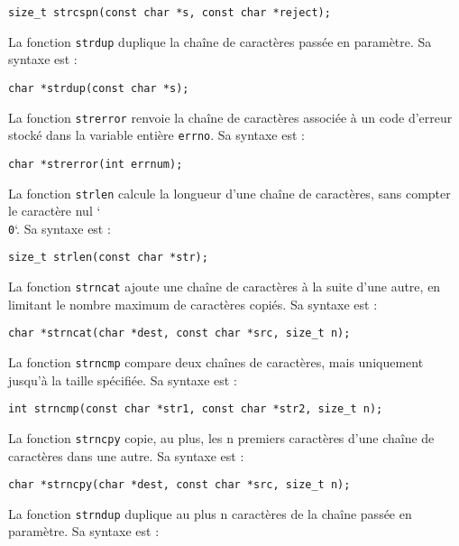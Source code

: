 \documentclass[french,11pt]{article}
\begin{document}
\begin{verbatim}
size_t strcspn(const char *s, const char *reject);
\end{verbatim}

La fonction \texttt{strdup} duplique la chaîne de caractères passée en paramètre. Sa syntaxe est :

\begin{verbatim}
char *strdup(const char *s);
\end{verbatim}

La fonction \texttt{strerror} renvoie la chaîne de caractères associée à un code d'erreur stocké dans la variable entière \texttt{errno}. Sa syntaxe est :

\begin{verbatim}
char *strerror(int errnum);
\end{verbatim}

La fonction \texttt{strlen} calcule la longueur d'une chaîne de caractères, sans compter le caractère nul `\texttt{\\0}`. Sa syntaxe est :

\begin{verbatim}
size_t strlen(const char *str);
\end{verbatim}

La fonction \texttt{strncat} ajoute une chaîne de caractères à la suite d'une autre, en limitant le nombre maximum de caractères copiés. Sa syntaxe est :

\begin{verbatim}
char *strncat(char *dest, const char *src, size_t n);
\end{verbatim}

La fonction \texttt{strncmp} compare deux chaînes de caractères, mais uniquement jusqu'à la taille spécifiée. Sa syntaxe est :

\begin{verbatim}
int strncmp(const char *str1, const char *str2, size_t n);
\end{verbatim}

La fonction \texttt{strncpy} copie, au plus, les n premiers caractères d'une chaîne de caractères dans une autre. Sa syntaxe est :

\begin{verbatim}
char *strncpy(char *dest, const char *src, size_t n);
\end{verbatim}

La fonction \texttt{strndup} duplique au plus n caractères de la chaîne passée en paramètre. Sa syntaxe est :
\end{document}
